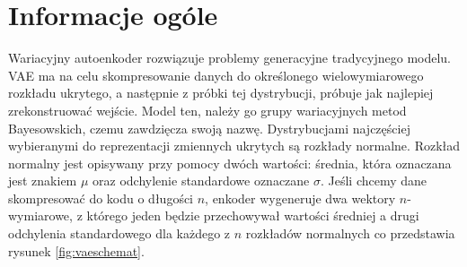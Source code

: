 \documentclass[a4paper,12pt]{book} %
\begin{document}
\section{Informacje ogóle}
Wariacyjny autoenkoder rozwiązuje problemy generacyjne tradycyjnego modelu. VAE ma na celu skompresowanie danych do określonego wielowymiarowego rozkładu ukrytego, a następnie z próbki tej dystrybucji, próbuje jak najlepiej zrekonstruować wejście. Model ten, należy go grupy wariacyjnych metod Bayesowskich, czemu zawdzięcza swoją nazwę. Dystrybucjami najczęściej wybieranymi do reprezentacji zmiennych ukrytych są rozkłady normalne. Rozkład normalny jest opisywany przy pomocy dwóch wartości: średnia, która oznaczana jest znakiem $\mu$ oraz odchylenie standardowe oznaczane $\sigma$. Jeśli chcemy dane skompresować do kodu o długości $n$, enkoder wygeneruje dwa wektory $n$-wymiarowe, z którego jeden będzie przechowywał wartości średniej a drugi odchylenia standardowego dla każdego z $n$ rozkładów normalnych co przedstawia rysunek \ref{fig:vaeschemat}.
\end{document}
